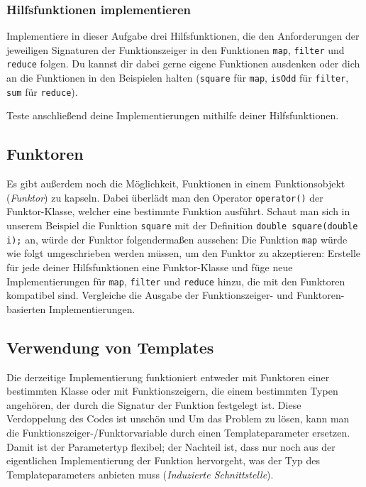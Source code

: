 \subsubsection{Hilfsfunktionen implementieren}

Implementiere in dieser Aufgabe drei Hilfsfunktionen, die den Anforderungen der jeweiligen Signaturen der Funktionszeiger in den Funktionen \lstinline{map}, \lstinline{filter} und \lstinline{reduce} folgen.
Du kannst dir dabei gerne eigene Funktionen ausdenken oder dich an die Funktionen in den Beispielen halten (\bspw \lstinline|square| für \lstinline|map|, \lstinline|isOdd| für \lstinline|filter|, \lstinline|sum| für \lstinline|reduce|). 

Teste anschließend deine Implementierungen mithilfe deiner Hilfsfunktionen.

\subsection{Funktoren}
\label{sec:functional_functor}
Es gibt außerdem noch die Möglichkeit, Funktionen in einem Funktionsobjekt (\emph{Funktor}) zu kapseln.
Dabei überlädt man den Operator \lstinline{operator()} der Funktor-Klasse, welcher eine bestimmte Funktion ausführt. 
Schaut man sich in unserem Beispiel die Funktion \lstinline{square} mit der Definition \lstinline{double square(double i);} an, würde der Funktor folgendermaßen aussehen:
%
%
Die Funktion \lstinline{map} würde wie folgt umgeschrieben werden müssen, um den Funktor zu akzeptieren:
%
%
Erstelle für jede deiner Hilfsfunktionen eine Funktor-Klasse und füge neue Implementierungen für \lstinline{map}, \lstinline{filter} und \lstinline{reduce} hinzu, die mit den Funktoren kompatibel sind.
Vergleiche die Ausgabe der Funktionszeiger- und Funktoren-basierten Implementierungen.

\subsection{Verwendung von Templates}
\label{sec:functional_template}
Die derzeitige Implementierung funktioniert entweder mit Funktoren einer bestimmten Klasse oder mit Funktionszeigern, die einem bestimmten Typen angehören, der durch die Signatur der Funktion festgelegt ist.
Diese Verdoppelung des Codes ist unschön und 
Um das Problem zu lösen, kann man die Funktionszeiger-/Funktorvariable durch einen Templateparameter ersetzen.
Damit ist der Parametertyp flexibel;
der Nachteil ist, dass nur noch aus der eigentlichen Implementierung der Funktion hervorgeht, was der Typ des Templateparameters anbieten muss (\emph{Induzierte Schnittstelle}).


